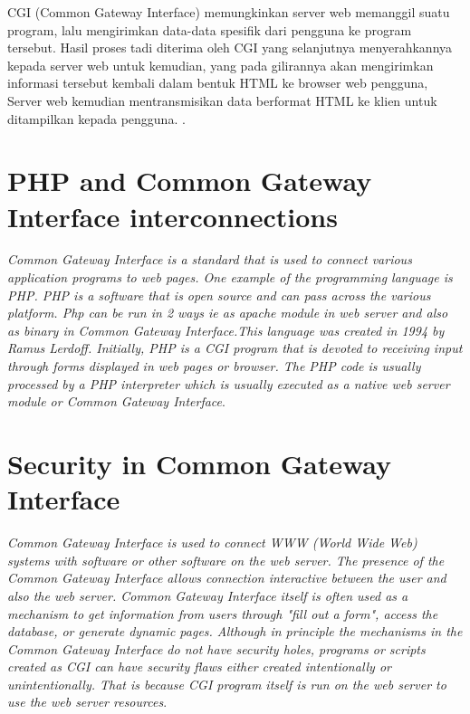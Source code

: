 \par  CGI (Common Gateway Interface) memungkinkan server web memanggil suatu program, lalu mengirimkan data-data spesifik dari pengguna ke program tersebut.
 Hasil proses tadi diterima oleh CGI yang selanjutnya menyerahkannya kepada server web untuk kemudian, yang pada gilirannya akan mengirimkan
informasi tersebut kembali dalam bentuk HTML ke browser web pengguna, Server web kemudian mentransmisikan data berformat HTML ke klien untuk ditampilkan kepada pengguna. \cite{ibrahim2011sistem}.

\section{PHP and Common Gateway Interface interconnections }
\textit {Common Gateway Interface is a standard that is used to connect various application programs to web pages. One example of the programming language is PHP. PHP is a software that is open source and can pass across the various platform. Php can be run in 2 ways ie as apache module in web server and also as binary in Common Gateway Interface.This language was created in 1994 by Ramus Lerdoff.  Initially, PHP is a CGI program that is devoted to receiving input through forms displayed in web pages or browser. The PHP code is usually processed by a PHP interpreter which is usually executed as a native web server module or Common Gateway Interface}\cite{nahado2015bumbu}.


\section{Security in Common Gateway Interface }
\textit {Common Gateway Interface is used to connect WWW (World Wide Web) systems with software or other software on the web server. The presence of the Common Gateway Interface allows connection interactive between the user and also the web server. Common Gateway Interface itself is often used as a mechanism to get information from users through "fill out a form", access the database, or generate dynamic pages. Although in principle the mechanisms in the Common Gateway Interface do not have security holes, programs or scripts created as CGI can have security flaws either created intentionally or unintentionally. That is because CGI program itself is run on the web server to use the web server resources}\cite{afrianto2015materi}.


